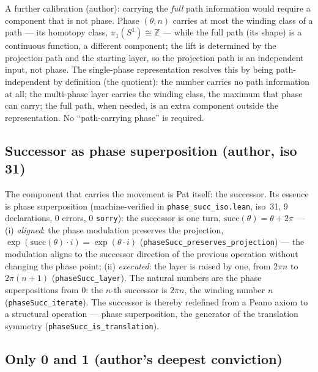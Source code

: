 \documentclass{article}
\begin{document}
A further calibration (author): carrying the \emph{full} path
information would require a component that is not phase. Phase
$(\theta,n)$ carries at most the winding class of a path --- its
homotopy class, $\pi_1(S^1)\cong\mathbb Z$ --- while the full path (its
shape) is a continuous function, a different component; the lift is
determined by the projection path and the starting layer, so the
projection path is an independent input, not phase. The single-phase
representation resolves this by being path-independent by definition
(the quotient): the number carries no path information at all; the
multi-phase layer carries the winding class, the maximum that phase can
carry; the full path, when needed, is an extra component outside the
representation. No ``path-carrying phase'' is required.

\subsection*{Successor as phase superposition (author, iso 31)}

The component that carries the movement is Pat itself: the successor.
Its essence is phase superposition (machine-verified in
\texttt{phase\_succ\_iso.lean}, iso~31, 9 declarations, 0 errors, 0
\texttt{sorry}): the successor is one turn,
$\mathrm{succ}(\theta)=\theta+2\pi$ --- (i) \emph{aligned}: the phase
modulation preserves the projection,
$\exp(\mathrm{succ}(\theta)\cdot i)=\exp(\theta\cdot i)$
(\texttt{phaseSucc\_preserves\_projection}) --- the modulation aligns to
the successor direction of the previous operation without changing the
phase point; (ii) \emph{executed}: the layer is raised by one, from
$2\pi n$ to $2\pi(n+1)$ (\texttt{phaseSucc\_layer}). The natural numbers
are the phase superpositions from $0$: the $n$-th successor is $2\pi n$,
the winding number $n$ (\texttt{phaseSucc\_iterate}). The successor is
thereby redefined from a Peano axiom to a structural operation --- phase
superposition, the generator of the translation symmetry
(\texttt{phaseSucc\_is\_translation}).

\subsection*{Only 0 and 1 (author's deepest conviction)}
\end{document}
